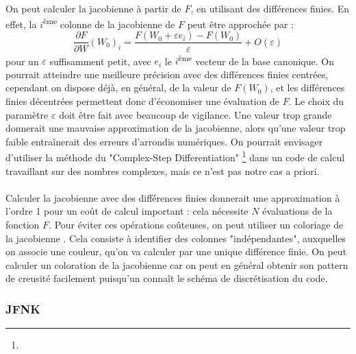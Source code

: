       \paragraph{}
      On peut calculer la jacobienne à partir de $F$, en utilisant des différences finies.
      En effet, la $i$\textsuperscript{ème} colonne de la jacobienne de $F$ peut être approchée par :
      \[\frac{\partial F}{\partial W}\left(W_0\right)_i = \frac{F\left(W_0 + \varepsilon e_i\right) - F\left(W_0\right)}{\varepsilon} + O\left(\varepsilon\right)\]
      pour un $\varepsilon$ suffisamment petit, avec $e_i$ le $i$\textsuperscript{ème} vecteur de la base canonique.
      On pourrait atteindre une meilleure précision avec des différences finies centrées, cependant on dispose déjà, en général, de la valeur de $F\left(W_0\right)$, et les différences finies décentrées permettent donc d'économiser une évaluation de $F$.
      Le choix du paramètre $\varepsilon$ doit être fait avec beaucoup de vigilance.
      Une valeur trop grande donnerait une mauvaise approximation de la jacobienne, alors qu'une valeur trop faible entraînerait des erreurs d'arrondis numériques.
      On pourrait envisager d'utiliser la méthode du "Complex-Step Differentiation" \footnote{} dans un code de calcul travaillant sur des nombres complexes, mais ce n'est pas notre cas a priori.

      \paragraph{}
      Calculer la jacobienne avec des différences finies donnerait une approximation à l'ordre 1 pour un coût de calcul important : cela nécessite $N$ évaluations de la fonction $F$.
      Pour éviter ces opérations coûteuses, on peut utiliser un coloriage de la jacobienne \cite{GebremedhinMannePothen2005}.
      Cela consiste à identifier des colonnes "indépendantes", auxquelles on associe une couleur, qu'on va calculer par une unique différence finie.
      On peut calculer un coloration de la jacobienne car on peut en général obtenir son pattern de creusité facilement puisqu'un connaît le schéma de discrétisation du code.

    \subsubsection{JFNK}

